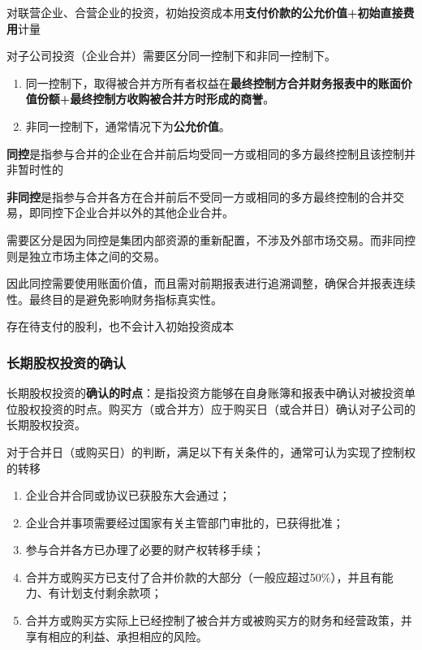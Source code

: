 \documentclass[UTF8,12pt]{ctexart}
\numberwithin{equation}{section} %
\numberwithin{figure}{section}
\numberwithin{table}{section}
\begin{document}
	对联营企业、合营企业的投资，初始投资成本用\textbf{支付价款的公允价值+初始直接费用}计量
	
	对子公司投资（企业合并）需要区分同一控制下和非同一控制下。
	\begin{enumerate}
		\item 同一控制下，取得被合并方所有者权益在\textbf{最终控制方合并财务报表中的账面价值份额+最终控制方收购被合并方时形成的商誉}。
		
		\item 非同一控制下，通常情况下为\textbf{公允价值}。
	\end{enumerate}
	
	\textbf{同控}是指参与合并的企业在合并前后均受同一方或相同的多方最终控制且该控制并非暂时性的
	
	\textbf{非同控}是指参与合并各方在合并前后不受同一方或相同的多方最终控制的合并交易，即同控下企业合并以外的其他企业合并。
	
	需要区分是因为同控是集团内部资源的重新配置，不涉及外部市场交易。而非同控则是独立市场主体之间的交易。
	
	因此同控需要使用账面价值，而且需对前期报表进行追溯调整，确保合并报表连续性。最终目的是避免影响财务指标真实性。
	
	存在待支付的股利，也不会计入初始投资成本
	
	\subsubsection{长期股权投资的确认}
	长期股权投资的\textbf{确认的时点}：是指投资方能够在自身账簿和报表中确认对被投资单位股权投资的时点。购买方（或合并方）应于购买日（或合并日）确认对子公司的长期股权投资。
	
	对于合并日（或购买日）的判断，满足以下有关条件的，通常可认为实现了控制权的转移
	\begin{enumerate}
		\item 企业合并合同或协议已获股东大会通过；
		
		\item 企业合并事项需要经过国家有关主管部门审批的，已获得批准；
			
		\item 参与合并各方已办理了必要的财产权转移手续；
		
		\item 合并方或购买方已支付了合并价款的大部分（一般应超过50\%），并且有能力、有计划支付剩余款项；
		
		\item 合并方或购买方实际上已经控制了被合并方或被购买方的财务和经营政策，并享有相应的利益、承担相应的风险。
	\end{enumerate}
	
\end{document}
